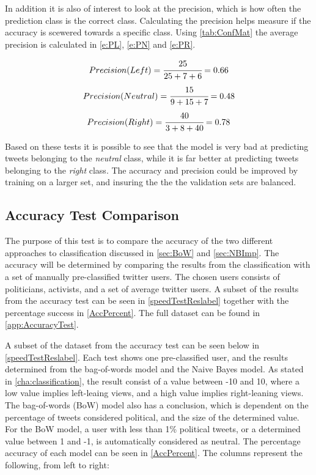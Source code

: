 In addition it is also of interest to look at the precision, which is how often
the prediction class is the correct class. Calculating the precision helps
measure if the accuracy is scewered towards a specific class. Using
\autoref{tab:ConfMat} the average precision is calculated in \autoref{e:PL},
\autoref{e:PN} and \autoref{e:PR}.

\begin{equation}\label{e:PL}
Precision(Left) = \cfrac{25}{25+7+6} = 0.66
\end{equation}
\begin{equation}\label{e:PN}
Precision(Neutral) = \cfrac{15}{9+15+7} = 0.48
\end{equation}
\begin{equation}\label{e:PR}
Precision(Right) = \cfrac{40}{3+8+40} = 0.78
\end{equation}

Based on these tests it is possible to see that the model is very bad at
predicting tweets belonging to the \textit{neutral} class, while it is far
better at predicting tweets belonging to the \textit{right} class. The accuracy
and precision could be improved by training on a larger set, and insuring the
the the validation sets are balanced.

\subsection{Accuracy Test Comparison}
The purpose of this test is to compare the accuracy of the two different
approaches to classification discussed in \autoref{sec:BoW} and
\autoref{sec:NBImp}. The accuracy will be determined by comparing the results
from the classification with a set of manually pre-classified twitter users.
The chosen users consists of politicians, activists, and a set of average
twitter users. A subset of the results from the accuracy test can be seen in
\autoref{speedTestReslabel} together with the percentage success in
\autoref{AccPercent}. The full dataset can be found in
\autoref{app:AccuracyTest}.\nl

A subset of the dataset from the accuracy test can be seen below in
\autoref{speedTestReslabel}. Each test shows one pre-classified user, and the
results determined from the bag-of-words model and the Naive Bayes model. As
stated in \autoref{cha:classification}, the result consist of a value between -10 and 10,
where a low value implies left-leaing views, and a high value implies right-leaning views. The
bag-of-words (BoW) model also has a conclusion, which is dependent on the
percentage of tweets considered political, and the size of the determined value.
For the BoW model, a user with less than 1\% political tweets, or a determined
value between 1 and -1, is automatically considered as neutral. The percentage
accuracy of each model can be seen in \autoref{AccPercent}.
The columns represent the following, from left to right:\nl

